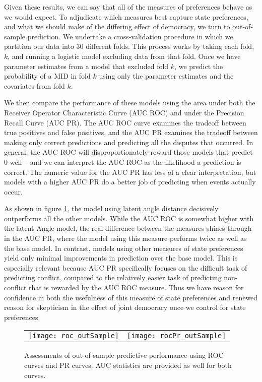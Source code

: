 Given these results, we can say that all of the measures of preferences behave as we would expect. To adjudicate which measures best capture state preferences, and what we should make of the differing effect of democracy, we turn to out-of-sample prediction. We undertake a cross-validation procedure in which we partition our data into 30 different folds. This process works by taking each fold, $k$, and running a logistic model excluding data from that fold. Once we have parameter estimates from a model that excluded fold $k$, we predict the probability of a MID in fold $k$ using only the parameter estimates and the covariates from fold $k$.

We then compare the performance of these models using the area under both the Receiver Operator Characteristic Curve (AUC ROC) and under the Precision Recall Curve (AUC PR). The AUC ROC curve examines the tradeoff between true positives and false positives, and the AUC PR examines the tradeoff between making only correct predictions and predicting all the disputes that occurred. In general, the AUC ROC will disproportionately reward those models that predict $0$ well -- and we can interpret the AUC ROC as the likelihood a prediction is correct. The numeric value for the AUC PR has less of a clear interpretation, but models with a higher AUC PR do a better job of predicting when events actually occur.

As shown in figure \ref{fig:roc}, the model using latent angle distance decisively outperforms all the other models. While the AUC ROC is somewhat higher with the latent Angle model, the real difference between the measures shines through in the AUC PR, where the model using this measure performs twice as well as the base model. In contrast, models using other measures of state preferences yield only minimal improvements in prediction over the base model. This is especially relevant because AUC PR specifically focuses on the difficult task of predicting conflict, compared to the relatively easier task of predicting non-conflict that is rewarded by the AUC ROC measure. Thus we have reason for confidence in both the usefulness of this measure of state preferences and renewed reason for skepticism in the effect of joint democracy once we control for state preferences. 

\begin{figure}[ht]
	\centering
	\begin{tabular}{cc}
	\texttt{[image: roc\_outSample]} & 
	\texttt{[image: rocPr\_outSample]}	
	\end{tabular}
	\caption{Assessments of out-of-sample predictive performance using ROC curves and PR curves. AUC statistics are provided as well for both curves.}
	\label{fig:roc}
\end{figure}
\FloatBarrier
